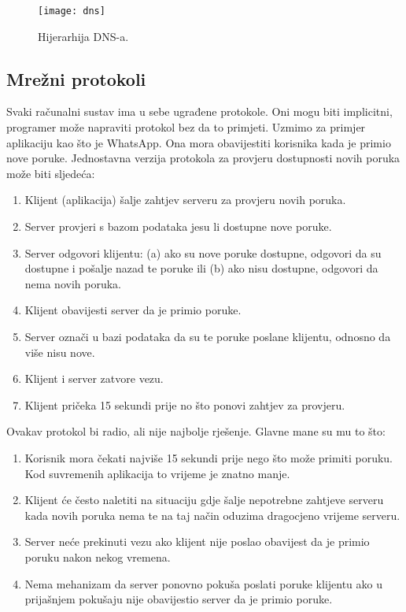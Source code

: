 
\begin{figure}[h]
    \texttt{[image: dns]}
    \caption{Hijerarhija DNS-a.}\label{fig:dns}
\end{figure}

\subsection{Mrežni protokoli}

Svaki računalni sustav ima u sebe ugrađene protokole.
Oni mogu biti implicitni, programer može napraviti protokol bez da to primjeti.
Uzmimo za primjer aplikaciju kao što je WhatsApp.
Ona mora obavijestiti korisnika kada je primio nove poruke.
Jednostavna verzija protokola za provjeru dostupnosti novih poruka može biti sljedeća:
\begin{enumerate}
    \item Klijent (aplikacija) šalje zahtjev serveru za provjeru novih poruka.
    \item Server provjeri s bazom podataka jesu li dostupne nove poruke.
    \item Server odgovori klijentu: (a) ako su nove poruke dostupne, odgovori da su dostupne i pošalje nazad te poruke ili (b) ako nisu dostupne, odgovori da nema novih poruka.
    \item Klijent obavijesti server da je primio poruke.
    \item Server označi u bazi podataka da su te poruke poslane klijentu, odnosno da više nisu nove.
    \item Klijent i server zatvore vezu.
    \item Klijent pričeka 15 sekundi prije no što ponovi zahtjev za provjeru.
\end{enumerate}

Ovakav protokol bi radio, ali nije najbolje rješenje.
Glavne mane su mu to što:
\begin{enumerate}
    \item Korisnik mora čekati najviše 15 sekundi prije nego što može primiti poruku. Kod suvremenih aplikacija to vrijeme je znatno manje.
    \item Klijent će često naletiti na situaciju gdje šalje nepotrebne zahtjeve serveru kada novih poruka nema te na taj način oduzima dragocjeno vrijeme serveru.
    \item Server neće prekinuti vezu ako klijent nije poslao obavijest da je primio poruku nakon nekog vremena.
    \item Nema mehanizam da server ponovno pokuša poslati poruke klijentu ako u prijašnjem pokušaju nije obavijestio server da je primio poruke.
\end{enumerate}


